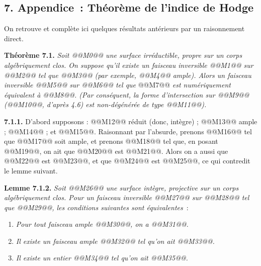 
\subsection*{7. Appendice~: Th\'eor\`eme de l'indice de Hodge}

On retrouve et compl\`ete ici quelques r\'esultats ant\'erieurs par un raisonnement direct.

\textbf{Th\'eor\`eme 7.1.} \emph{Soit @@M0@@ une surface irr\'eductible, propre sur un corps alg\'ebriquement clos. On suppose qu'il existe un faisceau inversible @@M1@@ sur @@M2@@ tel que @@M3@@ (par exemple, @@M4@@ ample). Alors un faisceau inversible @@M5@@ sur @@M6@@ tel que}
@@M7@@
\emph{est num\'eriquement \'equivalent \`a @@M8@@. (Par cons\'equent, la forme d'intersection sur @@M9@@ (@@M10@@, d'apr\`es 4.6) est non-d\'eg\'en\'er\'ee de type @@M11@@).}

\textbf{7.1.1.} D'abord supposons : @@M12@@ r\'eduit (donc, int\`egre) ; @@M13@@ ample ; @@M14@@ ; et @@M15@@. Raisonnant par l'absurde, prenons @@M16@@ tel que @@M17@@ soit ample, et prenons @@M18@@ tel que, en posant @@M19@@, on ait que @@M20@@ est @@M21@@. Alors on a aussi que @@M22@@ est @@M23@@, et que @@M24@@ est @@M25@@, ce qui contredit le lemme suivant.

\textbf{Lemme 7.1.2.} \emph{Soit @@M26@@ une surface int\`egre, projective sur un corps alg\'ebriquement clos. Pour un faisceau inversible @@M27@@ sur @@M28@@ tel que @@M29@@, les conditions suivantes sont \'equivalentes}~:
\begin{enumerate}[label=(\roman*)]
\item \emph{Pour tout faisceau ample @@M30@@, on a @@M31@@.}
\item[(i')] \emph{Il existe un faisceau ample @@M32@@ tel qu'on ait @@M33@@.}
\item \emph{Il existe un entier @@M34@@ tel qu'on ait @@M35@@.}
\end{enumerate}

